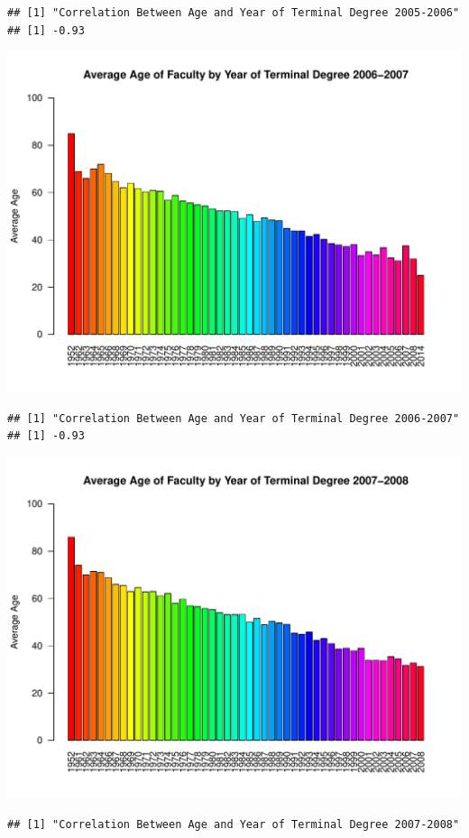 \documentclass[12pt,a4paper]{article}\usepackage[]{graphicx}\usepackage[]{color}
\makeatletter
\def\maxwidth{ %
  \ifdim\Gin@nat@width>\linewidth
    \linewidth
  \else
    \Gin@nat@width
  \fi
}
\newenvironment{kframe}{%
 \def\at@end@of@kframe{}%
 \ifinner\ifhmode%
  \def\at@end@of@kframe{\end{minipage}}%
  \begin{minipage}{\columnwidth}%
 \fi\fi%
 \def\FrameCommand##1{\hskip\@totalleftmargin \hskip-\fboxsep
 \colorbox{shadecolor}{##1}\hskip-\fboxsep
     \hskip-\linewidth \hskip-\@totalleftmargin \hskip\columnwidth}%
 \MakeFramed {\advance\hsize-\width
   \@totalleftmargin\z@ \linewidth\hsize
   \@setminipage}}%
 {\par\unskip\endMakeFramed%
 \at@end@of@kframe}
\newenvironment{knitrout}{}{} %
\theoremstyle{definition}
\makeatother
\begin{document}
\begin{knitrout}
\begin{kframe}
\begin{verbatim}
## [1] "Correlation Between Age and Year of Terminal Degree 2005-2006"
## [1] -0.93
\end{verbatim}
\end{kframe}
\includegraphics[width=\maxwidth]{figure/unnamed-chunk-12-3} 
\begin{kframe}\begin{verbatim}
## [1] "Correlation Between Age and Year of Terminal Degree 2006-2007"
## [1] -0.93
\end{verbatim}
\end{kframe}
\includegraphics[width=\maxwidth]{figure/unnamed-chunk-12-4} 
\begin{kframe}\begin{verbatim}
## [1] "Correlation Between Age and Year of Terminal Degree 2007-2008"

\end{verbatim}
\end{kframe}
\end{knitrout}
\end{document}
